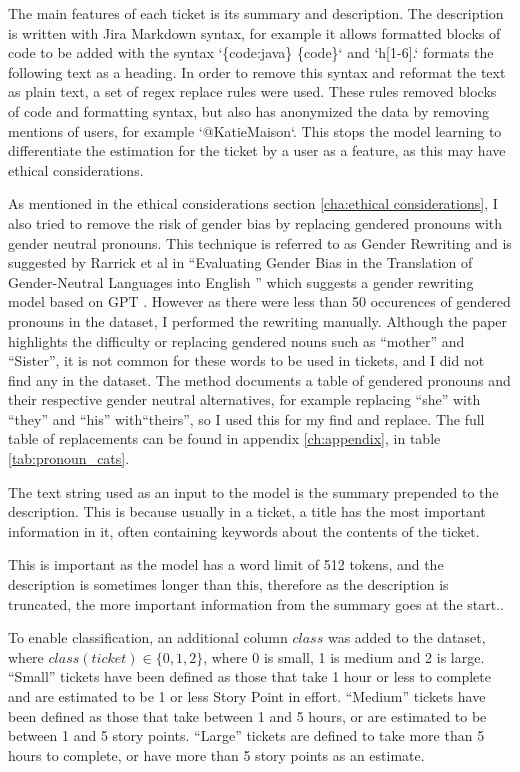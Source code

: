 \documentclass{UoYCSproject}
\begin{document}
    The main features of each ticket is its summary and description.
    The description is written with Jira Markdown syntax, for example it allows formatted blocks of code to be added with the syntax `\{code:java\} \{code\}` and `h[1-6].` formats the following text as a heading.
    In order to remove this syntax and reformat the text as plain text, a set of regex replace rules were used.
    These rules removed blocks of code and formatting syntax, but also has anonymized the data by removing mentions of users, for example `@KatieMaison`.
    This stops the model learning to differentiate the estimation for the ticket by a user as a feature, as this may have ethical considerations. \par
    As mentioned in the ethical considerations section \ref{cha:ethical considerations}, I also tried to remove the risk of gender bias by replacing gendered pronouns with gender neutral pronouns.
 This technique is referred to as Gender Rewriting and is suggested by Rarrick et al in ``Evaluating Gender Bias in the Translation of Gender-Neutral Languages into English
'' which suggests a gender rewriting model based on GPT \cite{rarrick2023evaluating}. However as there were less than 50 occurences of gendered pronouns in the dataset, I performed the rewriting manually.
    Although the paper highlights the difficulty or replacing gendered nouns such as ``mother'' and ``Sister'', it is not common for these words to be used in tickets, and I did not find any in the dataset.
    The method documents a table of gendered pronouns and their respective gender neutral alternatives, for example replacing ``she'' with ``they'' and ``his'' with``theirs'', so I used this for my find and replace.
    The full table of replacements can be found in appendix \ref{ch:appendix}, in table \ref{tab:pronoun_cats}.

    The text string used as an input to the model is the summary prepended to the description.
    This is because usually in a ticket, a title has the most important information in it, often containing keywords about the contents of the ticket. \par
    This is important as the model has a word limit of 512 tokens, and the description is sometimes longer than this, therefore as the description is truncated, the more important information from the summary goes at the start..

    To enable classification, an additional column $class$ was added to the dataset, where $class(ticket) \in \{0,1,2\}$, where 0 is small, 1 is medium and 2 is large.
    ``Small'' tickets have been defined as those that take 1 hour or less to complete and are estimated to be 1 or less Story Point in effort.
    ``Medium'' tickets have been defined as those that take between 1 and 5 hours, or are estimated to be between 1 and 5 story points.
    ``Large'' tickets are defined to take more than 5 hours to complete, or have more than 5 story points as an estimate.
\end{document}
